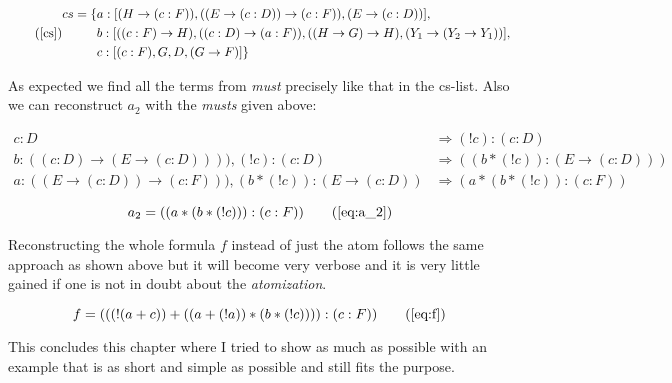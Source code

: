 \begin{equation*}
\tag{\ref{cs}}
\begin{split}
	cs = \{& a: [(H \rightarrow (c:F)), ((E \rightarrow (c:D)) \rightarrow (c:F)), (E \rightarrow (c:D))],\\
	& b: [((c:F) \rightarrow H), ((c:D) \rightarrow (a:F)), ((H \rightarrow G) \rightarrow H), (Y_1 \rightarrow (Y_2 \rightarrow Y_1))],\\
	& c: [(c:F), G, D, (G \rightarrow F)] \}
\end{split}
\end{equation*}

As expected we find all the terms from \emph{must} precisely like that in the cs-list. Also we can reconstruct $a_2$ with the \emph{musts} given above:

\begin{align*}
	c:D & \Rightarrow (!c):(c:D)\\
	b:((c:D) \rightarrow (E \rightarrow (c:D)))), (!c):(c:D) & \Rightarrow ((b*(!c)):(E \rightarrow (c:D)))\\
	a:((E \rightarrow (c:D)) \rightarrow (c:F))), (b*(!c)):(E \rightarrow (c:D)) & \Rightarrow (a *(b* (! c)):(c:F)) 
\end{align*}

\begin{equation*}		
	a_2 = ((a *(b* (! c))):(c:F)) 
	\tag{\ref{eq:a_2}}
\end{equation*}

Reconstructing the whole formula $f$ instead of just the atom follows the same approach as shown above but it will become very verbose and it is very little gained if one is not in doubt about the \emph{atomization}.

\begin{equation*}
	f = (((!(a+c))+((a+(!a))*(b*(!c)))):(c:F))
	\tag{\ref{eq:f}}
\end{equation*}




This concludes this chapter where I tried to show as much as possible with an example that is as short and simple as possible and still fits the purpose. 
